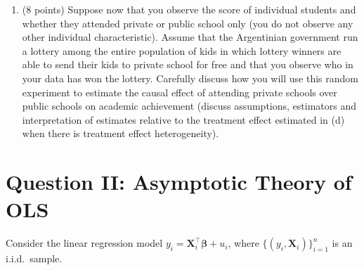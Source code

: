 \documentclass[letterpaper,12pt]{article}
\begin{document}
\begin{enumerate}[label=(\alph*)]
\begin{table}[H]
\begin{center}
{\begin{tabular}{lll}
\hline
\hline
\end{tabular}}
\end{center}
\captionsetup{width=0.80\textwidth}
\captionsetup{skip=0pt}
\caption*{Notes: Sample sizes are given in brackets}
\end{table}
Use Table 1 and Table 2 to calculate the ATE. Relate your result to the estimate of $\hat{\beta}_1$ in part (a) by indicating the magnitude of the selection bias and the magnitude of the heterogeneous treatment effect bias.  
\item (8 points) Suppose now that you observe the score of individual students and whether they attended private or public school only (you do not observe any other individual characteristic). Assume that the Argentinian government run a lottery among the entire population of kids in which lottery winners are able to send their kids to private school for free and that you observe who in your data has won the lottery. Carefully discuss how you will use this random experiment to estimate the causal effect of attending private schools over public schools on academic achievement (discuss assumptions, estimators and interpretation of estimates relative to the treatment effect estimated in (d) when there is treatment effect heterogeneity). 
\end{enumerate}


\section*{Question II: Asymptotic Theory of OLS}

Consider the linear regression model $y_i = \mathbf{X}_i^\top \boldsymbol{\beta} + u_i$, where $\{(y_i, \mathbf{X}_i)\}_{i=1}^n$ is an i.i.d.\ sample.
\end{document}
